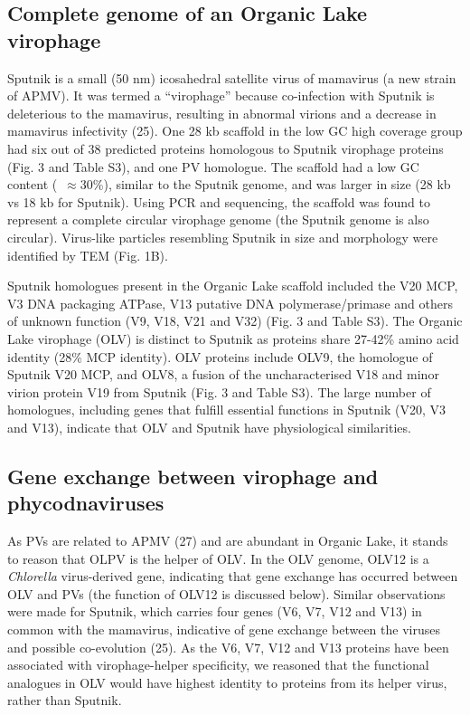 \subsection{Complete genome of an Organic Lake virophage}
Sputnik is a small (50 nm) icosahedral satellite virus of mamavirus (a new strain of APMV). 
It was termed a ``virophage'' because co-infection with Sputnik is deleterious to the mamavirus, resulting in abnormal virions and a decrease in mamavirus infectivity (25). 
One 28 kb scaffold in the low GC high coverage group had six out of 38 predicted proteins homologous to Sputnik virophage proteins (Fig. 3 and Table S3), and one PV homologue. 
The scaffold had a low GC content (~$\approx$30\%), similar to the Sputnik genome, and was larger in size (28 kb vs 18 kb for Sputnik). 
Using PCR and sequencing, the scaffold was found to represent a complete circular virophage genome (the Sputnik genome is also circular). Virus-like particles resembling Sputnik in size and morphology were identified by TEM (Fig. 1B).

Sputnik homologues present in the Organic Lake scaffold included the V20 MCP, V3 DNA packaging ATPase, V13 putative DNA polymerase/primase and others of unknown function (V9, V18, V21 and V32) (Fig. 3 and Table S3). 
The Organic Lake virophage (OLV) is distinct to Sputnik as proteins share 27-42\% amino acid identity (28\% MCP identity). 
OLV proteins include OLV9, the homologue of Sputnik V20 MCP, and OLV8, a fusion of the uncharacterised V18 and minor virion protein V19 from Sputnik (Fig. 3 and Table S3). 
The large number of homologues, including genes that fulfill essential functions in Sputnik (V20, V3 and V13), indicate that OLV and Sputnik have physiological similarities. 

\subsection{Gene exchange between virophage and phycodnaviruses}

As PVs are related to APMV (27) and are abundant in Organic Lake, it stands to reason that OLPV is the helper of OLV. 
In the OLV genome, OLV12 is a \emph{Chlorella} virus-derived gene, indicating that gene exchange has occurred between OLV and PVs (the function of OLV12 is discussed below). 
Similar observations were made for Sputnik, which carries four genes (V6, V7, V12 and V13) in common with the mamavirus, indicative of gene exchange between the viruses and possible co-evolution (25). 
As the V6, V7, V12 and V13 proteins have been associated with virophage-helper specificity, we reasoned that the functional analogues in OLV would have highest identity to proteins from its helper virus, rather than Sputnik. 

